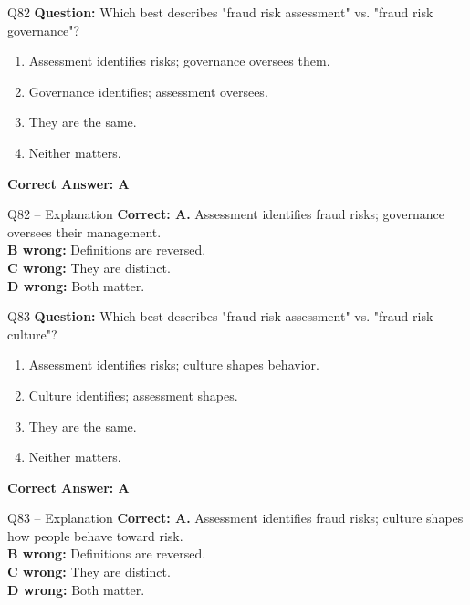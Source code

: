 \documentclass[aspectratio=169,10pt]{beamer}
\begin{document}
	\begin{frame}[t]{Q82}
		\small
		\textbf{Question:} Which best describes "fraud risk assessment" vs. "fraud risk governance"?
		\begin{enumerate}[label=\Alph*.,itemsep=1pt,topsep=2pt]
			\item Assessment identifies risks; governance oversees them.
			\item Governance identifies; assessment oversees.
			\item They are the same.
			\item Neither matters.
		\end{enumerate}
		\vspace{4pt}
		\textbf{Correct Answer: A}
	\end{frame}
	
	\begin{frame}[t]{Q82 -- Explanation}
		\small
		\textbf{Correct: A.} Assessment identifies fraud risks; governance oversees their management. \\[4pt]
		\textbf{B wrong:} Definitions are reversed. \\[2pt]
		\textbf{C wrong:} They are distinct. \\[2pt]
		\textbf{D wrong:} Both matter.
	\end{frame}
	
	\begin{frame}[t]{Q83}
		\small
		\textbf{Question:} Which best describes "fraud risk assessment" vs. "fraud risk culture"?
		\begin{enumerate}[label=\Alph*.,itemsep=1pt,topsep=2pt]
			\item Assessment identifies risks; culture shapes behavior.
			\item Culture identifies; assessment shapes.
			\item They are the same.
			\item Neither matters.
		\end{enumerate}
		\vspace{4pt}
		\textbf{Correct Answer: A}
	\end{frame}
	
	\begin{frame}[t]{Q83 -- Explanation}
		\small
		\textbf{Correct: A.} Assessment identifies fraud risks; culture shapes how people behave toward risk. \\[4pt]
		\textbf{B wrong:} Definitions are reversed. \\[2pt]
		\textbf{C wrong:} They are distinct. \\[2pt]
		\textbf{D wrong:} Both matter.
	\end{frame}
	
\end{document}
